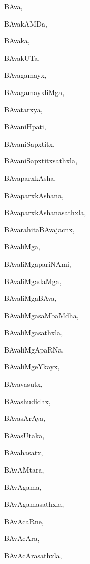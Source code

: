 \begin{multicols}{2}
{BAva}, \pageref{BAva}

{BAvakAMDa}, \pageref{BAvakAMDa}

{BAvaka}, \pageref{BAvaka}

{BAvakUTa}, \pageref{BAvakUTa}

{BAvagamayx}, \pageref{BAvagamayx}

{BAvagamayxliMga}, \pageref{BAvagamayxliMga}

{BAvatarxya}, \pageref{BAvatarxya}

{BAvaniHpati}, \pageref{BAvaniHpati}

{BAvaniSapxtitx}, \pageref{BAvaniSapxtitx}

{BAvaniSapxtitxsathxla}, \pageref{BAvaniSapxtitxsathxla}

{BAvaparxkAsha}, \pageref{BAvaparxkAsha}

{BAvaparxkAshana}, \pageref{BAvaparxkAshana}

{BAvaparxkAshanasathxla}, \pageref{BAvaparxkAshanasathxla}

{BAvarahitaBAvajacnx}, \pageref{BAvarahitaBAvajacnx}

{BAvaliMga}, \pageref{BAvaliMga}

{BAvaliMgapariNAmi}, \pageref{BAvaliMgapariNAmi}

{BAvaliMgadaMga}, \pageref{BAvaliMgadaMga}

{BAvaliMgaBAva}, \pageref{BAvaliMgaBAva}

{BAvaliMgasaMbaMdha}, \pageref{BAvaliMgasaMbaMdha}

{BAvaliMgasathxla}, \pageref{BAvaliMgasathxla}

{BAvaliMgApaRNa}, \pageref{BAvaliMgApaRNa}

{BAvaliMgeYkayx}, \pageref{BAvaliMgeYkayx}

{BAvavasutx}, \pageref{BAvavasutx}

{BAvashudidhx}, \pageref{BAvashudidhx}

{BAvasArAya}, \pageref{BAvasArAya}

{BAvasUtaka}, \pageref{BAvasUtaka}

{BAvahasatx}, \pageref{BAvahasatx}

{BAvAMtara}, \pageref{BAvAMtara}

{BAvAgama}, \pageref{BAvAgama}

{BAvAgamasathxla}, \pageref{BAvAgamasathxla}

{BAvAcaRne}, \pageref{BAvAcaRne}

{BAvAcAra}, \pageref{BAvAcAra}

{BAvAcArasathxla}, \pageref{BAvAcArasathxla}


\end{multicols}
